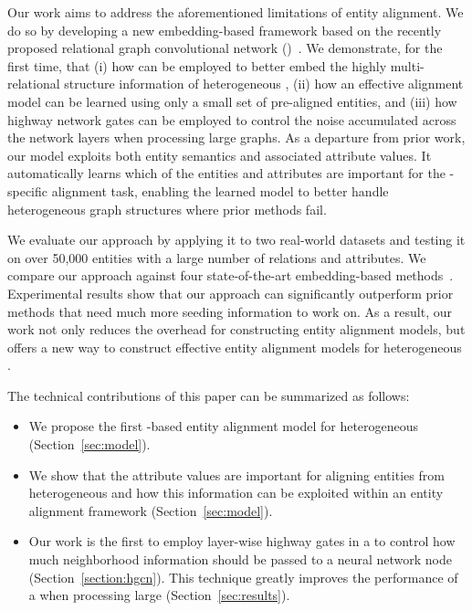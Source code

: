 Our work aims to address the aforementioned limitations of entity alignment. We do so by developing a new embedding-based framework based
on the recently proposed relational graph convolutional network (\RGCN)~\cite{Schlichtkrull2017Modeling}. We demonstrate, for the first
time, that (i) how \RGCNs can be employed to better embed the highly multi-relational structure information of heterogeneous \KGs, (ii) how
an effective alignment model can be learned using only a small set of pre-aligned entities, and (iii) how highway network gates can be
employed to control the noise accumulated across the network layers when processing large graphs. As a departure from prior work, our model
exploits both entity semantics and associated attribute values. It automatically learns which of the entities and attributes are important
for the \KG-specific alignment task, enabling the learned model to better handle heterogeneous graph structures where prior methods fail.

We evaluate our approach by applying it to two real-world datasets and testing it on over 50,000 entities with a large number of relations
and attributes. We compare our approach against four state-of-the-art embedding-based
methods~\cite{hao2016joint,chen2016multilingual,sun2017cross,zhu2017iterative}. Experimental results show that our approach can
significantly outperform prior methods that need much more seeding information to work on. As a result, our work not only reduces the
overhead for constructing entity alignment models, but offers a new way to construct effective entity alignment models for heterogeneous
\KGs.


	
	The technical contributions of this paper can be summarized as follows:
	\begin{itemize}
		\item We propose the first \RGCN-based entity alignment model for heterogeneous \KGs (Section~\ref {sec:model}).
		
        \item We show that the attribute values are important for aligning entities from heterogeneous \KGs and how this information can
            be exploited within an entity alignment framework (Section~\ref{sec:model}).

		\item Our work is the first to employ layer-wise highway gates in a \RGCN to control how much neighborhood information should be
passed to a neural network node (Section~\ref{section:hgcn}). This technique greatly improves the performance of a \RGCN when processing
large \KGs (Section~\ref{sec:results}).
		
		
	\end{itemize}
